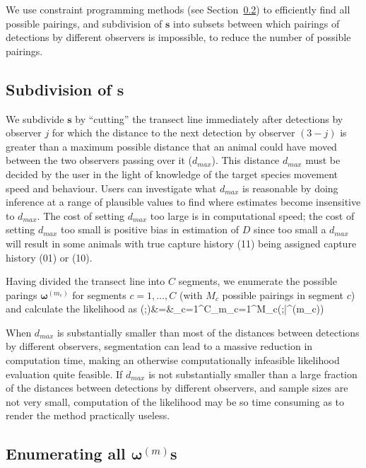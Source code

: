 \documentclass[useAMS, usenatbib, referee]{biom}\usepackage[]{graphicx}\usepackage[]{color}
\begin{document}
We use constraint programming methods (see Section~\ref{sec:constrprog}) to efficiently find all possible pairings, and subdivision of $\bm{s}$ into subsets between which pairings of detections by different observers is impossible, to reduce the number of possible pairings.

\subsection{Subdivision of $\bm{s}$}

We subdivide $\bm{s}$ by ``cutting'' the transect line immediately after detections by observer $j$ for which the distance to the next detection by observer $(3-j)$ is greater than a maximum possible distance that an animal could have moved between the two observers passing over it ($d_{max}$). This distance $d_{max}$ must be decided by the user in the light of knowledge of the target species movement speed and behaviour. Users can investigate what $d_{max}$ is reasonable by doing inference at a range of plausible values to find where estimates become insensitive to $d_{max}$. The cost of setting $d_{max}$ too large is in computational speed; the cost of setting $d_{max}$ too small is positive bias in estimation of $D$ since too small a $d_{max}$ will result in some animals with true capture history (11) being assigned capture history (01) or (10).

Having divided the transect line into $C$ segments, we enumerate the possible parings $\bm{\omega}^{(m_c)}$ for segments $c=1,\ldots,C$ (with $M_c$ possible pairings in segment $c$) and calculate the likelihood as 
\be
{}(\bm{\theta};)&=&\prod_{c=1}^C\sum_{m_c=1}^{M_c}(\bm{\theta};|\bm{\omega}^{(m_c)})
\ee

When $d_{max}$ is substantially smaller than most of the distances between detections by different observers, segmentation can lead to a massive reduction in computation time, making an otherwise computationally infeasible likelihood evaluation quite feasible. If $d_{max}$ is not substantially smaller than a large fraction of the distances between detections by different observers, and sample sizes are not very small, computation of the likelihood may be so time consuming as to render the method practically useless.

\subsection{Enumerating all $\bm{\omega}^{(m)}$s}
\label{sec:constrprog}
\end{document}
